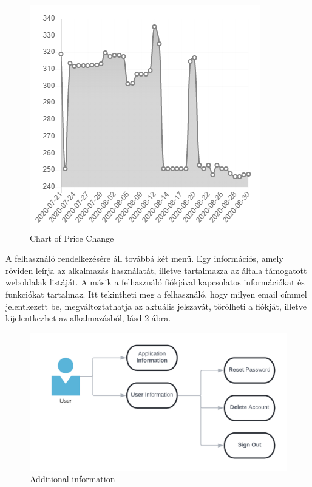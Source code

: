 \begin{figure}[H]
    \centering
    \includegraphics[scale=1]{figures/images/chart_example.png}
    \caption{Chart of Price Change}
    \label{fig:chart_example}
\end{figure}

A felhasználó rendelkezésére áll továbbá két menü. Egy információs, amely röviden leírja az alkalmazás használatát, illetve tartalmazza az általa támogatott weboldalak listáját. A másik a felhasználó fiókjával kapcsolatos információkat és funkciókat tartalmaz. Itt tekintheti meg a felhasználó, hogy milyen email címmel jelentkezett be, megváltoztathatja az aktuális jelszavát, törölheti a fiókját, illetve kijelentkezhet az alkalmazásból, lásd \ref{fig:additional_info} ábra.

\begin{figure}[H]
    \centering
    \includegraphics[scale=0.3]{figures/images/additional_features.png}
    \caption{Additional information}
    \label{fig:additional_info}
\end{figure}

